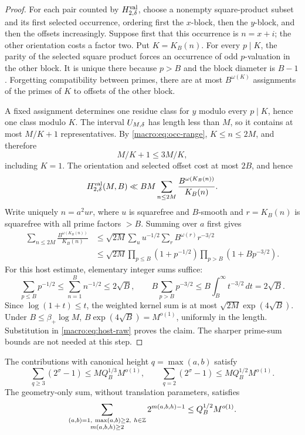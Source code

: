 \begin{proof}
For each pair counted by $H^{\rm val}_{2,\delta}$, choose a nonempty
square-product subset and its first selected occurrence, ordering first the $x$-block, then the $y$-block, and then
the offsets increasingly.  Suppose first that this occurrence is
$n=x+i$; the other orientation costs a factor two.  Put $K=K_B(n)$.
For every $p\mid K$, the parity of the selected square product forces
an occurrence of odd $p$-valuation in the other block.  It is unique
there because $p>B$ and the block diameter is $B-1$.  Forgetting
compatibility between primes, there are at most $B^{\omega(K)}$
assignments of the primes of $K$ to offsets of the other block.

A fixed assignment determines one residue class for $y$ modulo every
$p\mid K$, hence one class modulo $K$.  The interval $U_{M,\delta}$ has length
less than $M$, so it contains at most $M/K+1$ representatives.  By
\eqref{macro:eq:occ-range}, $K\leq n\leq2M$, and therefore
\[
 M/K+1\leq3M/K,
\]
including $K=1$.  The orientation and selected offset cost at most
$2B$, and hence
\begin{equation}\label{macro:eq:host-raw}
 H^{\rm val}_{2,\delta}(M,B)
 \ll BM\sum_{n\leq2M}\frac{B^{\omega(K_B(n))}}{K_B(n)}.
\end{equation}
Write uniquely $n=a^2ur$, where $u$ is squarefree and $B$-smooth and
$r=K_B(n)$ is squarefree with all prime factors $>B$.  Summing over
$a$ first gives
\begin{align*}
 \sum_{n\leq2M}\frac{B^{\omega(K_B(n))}}{K_B(n)}
 &\leq \sqrt{2M}
 \sum_u u^{-1/2}\sum_r B^{\omega(r)}r^{-3/2}\\
 &\leq \sqrt{2M}
 \prod_{p\leq B}(1+p^{-1/2})
 \prod_{p>B}(1+Bp^{-3/2}).
\end{align*}
For this host estimate, elementary integer sums suffice:
\[
 \sum_{p\le B}p^{-1/2}\le\sum_{n=1}^B n^{-1/2}\le2\sqrt B,
 \qquad B\sum_{p>B}p^{-3/2}
 \le B\int_B^\infty t^{-3/2}\,dt=2\sqrt B.
\]
Since $\log(1+t)\le t$, the weighted kernel sum is at most
$\sqrt{2M}\exp(4\sqrt B)$. Under $B\le\beta_+\log M$,
$B\exp(4\sqrt B)=M^{o(1)}$, uniformly in the length. Substitution in
\eqref{macro:eq:host-raw} proves the claim. The sharper prime-sum bounds
are not needed at this step.
\end{proof}
\begin{proposition}\label{macro:prop:systematic}
The contributions with canonical height $q=\max(a,b)$ satisfy
\begin{equation}\label{eq:systematic}
 \sum_{q\ge3}(2^\sigma-1)\le MQ_B^{1/3}M^{o(1)},\qquad
 \sum_{q=2}(2^\sigma-1)\le MQ_B^{1/2}M^{o(1)}.
\end{equation}
The geometry-only sum, without translation parameters, satisfies
\begin{equation}\label{macro:eq:geometry-sum}
 \sum_{\substack{(a,b)=1,\ \max(a,b)\ge2,\ h\in\Z\\m(a,b,h)\ge2}}2^{m(a,b,h)-1}\le Q_B^{1/2}M^{o(1)}.
\end{equation}
\end{proposition}
